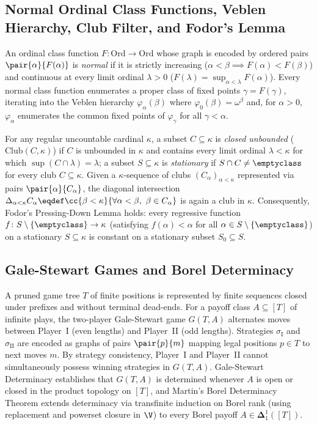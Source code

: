 \subsection{Normal Ordinal Class Functions, Veblen Hierarchy, Club Filter, and Fodor's Lemma}
\label{subsec:normal_functions_veblen_club_fodor}

An ordinal class function $F\colon \mathrm{Ord} \to \mathrm{Ord}$ whose graph is encoded by ordered pairs $\pair{\alpha}{F(\alpha)}$ is \emph{normal} if it is strictly increasing ($\alpha < \beta \implies F(\alpha) < F(\beta)$) and continuous at every limit ordinal $\lambda > 0$ ($F(\lambda) = \sup_{\alpha < \lambda} F(\alpha)$). Every normal class function enumerates a proper class of fixed points $\gamma = F(\gamma)$, iterating into the Veblen hierarchy $\varphi_\alpha(\beta)$ where $\varphi_0(\beta) = \omega^\beta$ and, for $\alpha > 0$, $\varphi_\alpha$ enumerates the common fixed points of $\varphi_\gamma$ for all $\gamma < \alpha$.

For any regular uncountable cardinal $\kappa$, a subset $C \subseteq \kappa$ is \emph{closed unbounded} ($\mathrm{Club}(C, \kappa)$) if $C$ is unbounded in $\kappa$ and contains every limit ordinal $\lambda < \kappa$ for which $\sup(C \cap \lambda) = \lambda$; a subset $S \subseteq \kappa$ is \emph{stationary} if $S \cap C \neq \emptyclass$ for every club $C \subseteq \kappa$. Given a $\kappa$-sequence of clubs $(C_\alpha)_{\alpha < \kappa}$ represented via pairs $\pair{\alpha}{C_\alpha}$, the diagonal intersection $\Delta_{\alpha < \kappa} C_\alpha \eqdef \cc{\beta < \kappa}{\forall \alpha < \beta,\ \beta \in C_\alpha}$ is again a club in $\kappa$. Consequently, Fodor's Pressing-Down Lemma holds: every regressive function $f\colon S \setminus \{\emptyclass\} \to \kappa$ (satisfying $f(\alpha) < \alpha$ for all $\alpha \in S \setminus \{\emptyclass\}$) on a stationary $S \subseteq \kappa$ is constant on a stationary subset $S_0 \subseteq S$.

\subsection{Gale-Stewart Games and Borel Determinacy}
\label{subsec:gale_stewart_borel_determinacy}

A pruned game tree $T$ of finite positions is represented by finite sequences closed under prefixes and without terminal dead-ends. For a payoff class $A \subseteq [T]$ of infinite plays, the two-player Gale-Stewart game $G(T, A)$ alternates moves between Player~I (even lengths) and Player~II (odd lengths). Strategies $\sigma_{\mathrm{I}}$ and $\sigma_{\mathrm{II}}$ are encoded as graphs of pairs $\pair{p}{m}$ mapping legal positions $p \in T$ to next moves $m$. By strategy consistency, Player~I and Player~II cannot simultaneously possess winning strategies in $G(T, A)$. Gale-Stewart Determinacy establishes that $G(T, A)$ is determined whenever $A$ is open or closed in the product topology on $[T]$, and Martin's Borel Determinacy Theorem extends determinacy via transfinite induction on Borel rank (using replacement and powerset closure in $\V$) to every Borel payoff $A \in \mathbf{\Delta}^1_1([T])$.


